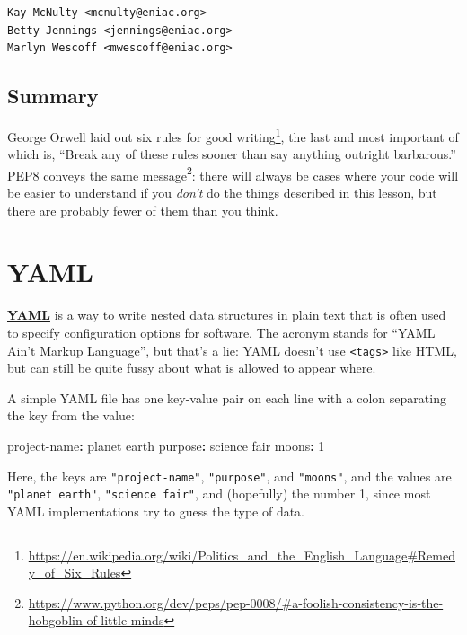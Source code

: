 \documentclass[
]{krantz}
\makeatletter
\newenvironment{Shaded}{\begin{snugshade}}{\end{snugshade}}
\newcommand{\AttributeTok}[1]{\textcolor[rgb]{0.77,0.63,0.00}{#1}}
\newcommand{\DecValTok}[1]{\textcolor[rgb]{0.00,0.00,0.81}{#1}}
\newcommand{\FunctionTok}[1]{\textcolor[rgb]{0.00,0.00,0.00}{#1}}
\newcommand{\KeywordTok}[1]{\textcolor[rgb]{0.13,0.29,0.53}{\textbf{#1}}}
\renewcommand{\href}[2]{#2\footnote{\url{#1}}}
\newenvironment{kframe}{%
\medskip{}
\setlength{\fboxsep}{.8em}
 \def\at@end@of@kframe{}%
 \ifinner\ifhmode%
  \def\at@end@of@kframe{\end{minipage}}%
  \begin{minipage}{\columnwidth}%
 \fi\fi%
 \def\FrameCommand##1{\hskip\@totalleftmargin \hskip-\fboxsep
 \colorbox{shadecolor}{##1}\hskip-\fboxsep
     \hskip-\linewidth \hskip-\@totalleftmargin \hskip\columnwidth}%
 \MakeFramed {\advance\hsize-\width
   \@totalleftmargin\z@ \linewidth\hsize
   \@setminipage}}%
 {\par\unskip\endMakeFramed%
 \at@end@of@kframe}
\renewenvironment{Shaded}{\begin{kframe}}{\end{kframe}}
\newcommand{\gref}[2]{\hyperlink{#2}{\textbf{#1}}}
\makeatother
\begin{document}
\begin{verbatim}
Kay McNulty <mcnulty@eniac.org>
Betty Jennings <jennings@eniac.org>
Marlyn Wescoff <mwescoff@eniac.org>
\end{verbatim}

\hypertarget{style-summary}{%
\section{Summary}\label{style-summary}}

George Orwell laid out \href{https://en.wikipedia.org/wiki/Politics_and_the_English_Language\#Remedy_of_Six_Rules}{six rules for good writing},
the last and most important of which is,
``Break any of these rules sooner than say anything outright barbarous.''
PEP8 conveys \href{https://www.python.org/dev/peps/pep-0008/\#a-foolish-consistency-is-the-hobgoblin-of-little-minds}{the same message}:
there will always be cases where your code will be easier to understand
if you \emph{don't} do the things described in this lesson,
but there are probably fewer of them than you think.

\hypertarget{yaml}{%
\chapter{YAML}\label{yaml}}

\gref{YAML}{yaml\_glossary} is a way to write nested data structures in plain text
that is often used to specify configuration options for software.
The acronym stands for ``YAML Ain't Markup Language'',
but that's a lie:
YAML doesn't use \texttt{\textless{}tags\textgreater{}} like HTML,
but can still be quite fussy about what is allowed to appear where.

A simple YAML file has one key-value pair on each line
with a colon separating the key from the value:

\begin{Shaded}
\begin{Highlighting}[]
\FunctionTok{project{-}name}\KeywordTok{:}\AttributeTok{ planet earth}
\FunctionTok{purpose}\KeywordTok{:}\AttributeTok{ science fair}
\FunctionTok{moons}\KeywordTok{:}\AttributeTok{ }\DecValTok{1}
\end{Highlighting}
\end{Shaded}

Here,
the keys are \texttt{"project-name"}, \texttt{"purpose"}, and \texttt{"moons"},
and the values are \texttt{"planet\ earth"},
\texttt{"science\ fair"},
and (hopefully) the number 1,
since most YAML implementations try to guess the type of data.
\end{document}

